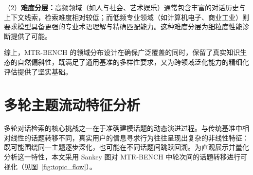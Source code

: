 （2）\textbf{难度分层：}高频领域（如人与社会、艺术娱乐）通常包含丰富的对话历史与上下文线索，检索难度相对较低；而低频专业领域（如计算机电子、商业工业）则要求模型具备更强的专业术语理解与精确匹配能力。这种难度分层为细粒度性能诊断提供了可能。

综上，MTR-BENCH 的领域分布设计在确保广泛覆盖的同时，保留了真实知识生态的自然偏斜性，既满足了通用基准的多样性要求，又为跨领域泛化能力的精细化评估提供了坚实基础。


\section{多轮主题流动特征分析}
\label{sec:topic_flow}

多轮对话检索的核心挑战之一在于准确建模话题的动态演进过程。与传统基准中相对线性的话题转移不同，真实用户的信息寻求行为往往呈现出复杂的非线性特征：既可能围绕同一主题逐步深化，也可能在不同话题间跳跃回溯。为直观展示并量化分析这一特性，本文采用 Sankey 图对 MTR-BENCH 中轮次间的话题转移进行可视化（见图~\ref{fig:topic_flow}）。



